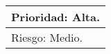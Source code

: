 \begin{longtable}{|l|l|}
\multicolumn{2}{|l|}{Prioridad: Alta.}                                                                                                                                                                                                                                                                                                                                                                                                    \\ \hline
\multicolumn{2}{|l|}{Riesgo: Medio.}                                                                                                                                                                                                                                                                                                                                                                                                      \\ \hline
\end{longtable}